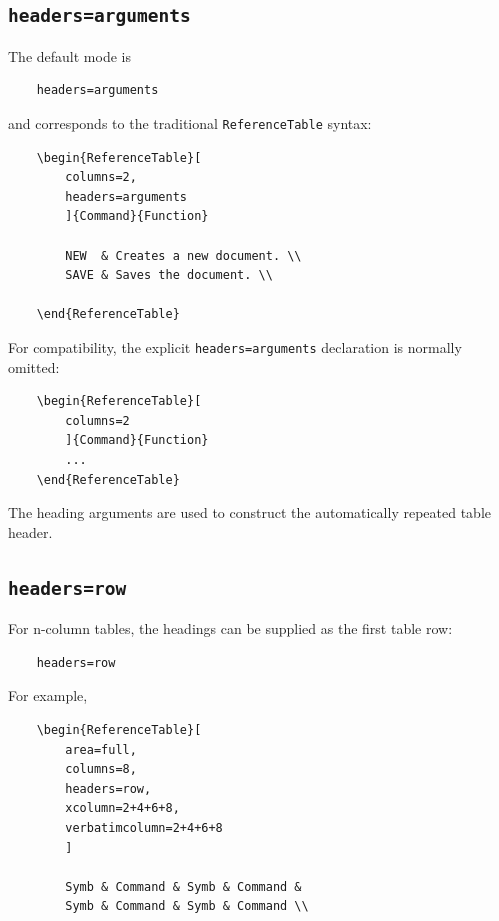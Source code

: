 \documentclass[
11pt,
a4paper,
oneside
]{scrbook}
\begin{document}
{%
\subsection{\texttt{headers=arguments}}

The default mode is
\begin{verbatim}
	headers=arguments
\end{verbatim}
and corresponds to the traditional \texttt{ReferenceTable} syntax:
\begin{verbatim}
	\begin{ReferenceTable}[
		columns=2,
		headers=arguments
		]{Command}{Function}
		
		NEW  & Creates a new document. \\
		SAVE & Saves the document. \\
		
	\end{ReferenceTable}
\end{verbatim}
For compatibility, the explicit \texttt{headers=arguments} declaration is
normally omitted:
\begin{verbatim}
	\begin{ReferenceTable}[
		columns=2
		]{Command}{Function}
		...
	\end{ReferenceTable}
\end{verbatim}
The heading arguments are used to construct the automatically repeated table
header.


\subsection{\texttt{headers=row}}

For n-column tables, the headings can be supplied as the first table row:
\begin{verbatim}
	headers=row
\end{verbatim}
For example,
\begin{verbatim}
	\begin{ReferenceTable}[
		area=full,
		columns=8,
		headers=row,
		xcolumn=2+4+6+8,
		verbatimcolumn=2+4+6+8
		]
		
		Symb & Command & Symb & Command &
		Symb & Command & Symb & Command \\
		

\end{verbatim}}
\end{document}
